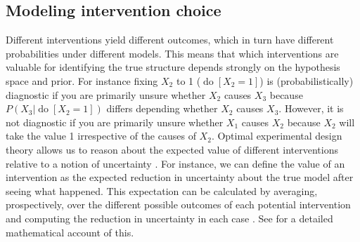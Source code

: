 \documentclass{cambridge7A}%
\DeclareMathOperator*{\Do}{do}
\newcommand{\ww}{\mathbf{w}} %
\newcommand{\cali}{\mathcal{A}} %
\newcommand{\E}{\mathbb{E}} %
\newcommand{\cm}{a} %
\newcommand{\dm}{d} %
\newcommand{\ca}{\mathbf{a}} %
\newcommand{\da}{\mathbf{d}} %
\begin{document}
\subsection{Modeling intervention choice}

Different interventions yield different outcomes, which in turn have different probabilities under different models.  This means that which interventions are valuable for identifying the true structure depends strongly on the hypothesis space and prior.  For instance fixing $X_2$ to 1 ($\Do[X_2\!=\!1]$) is (probabilistically) diagnostic if you are primarily unsure whether $X_2$ causes $X_3$ because $P(X_3|\Do[X_2\!=\!1])$ differs depending whether $X_2$ causes $X_3$.  However, it is not diagnostic if you are primarily unsure whether $X_1$ causes $X_2$ because $X_2$ will take the value 1 irrespective of the causes of $X_2$.  Optimal experimental design theory allows us to reason about the expected value of different interventions relative to a notion of uncertainty \citep{fedorov1972theory,raiffa1974applied}.  For instance, we can define the value of an intervention as the expected reduction in uncertainty about the true model after seeing what happened. This expectation can be calculated by averaging, prospectively, over the different possible outcomes of each potential intervention %
and computing the
reduction in uncertainty in each case \citep[e.g.,][]{shannon1951prediction}. See \cite{bramley2017neurath} for a detailed mathematical account of this.%
\end{document}
